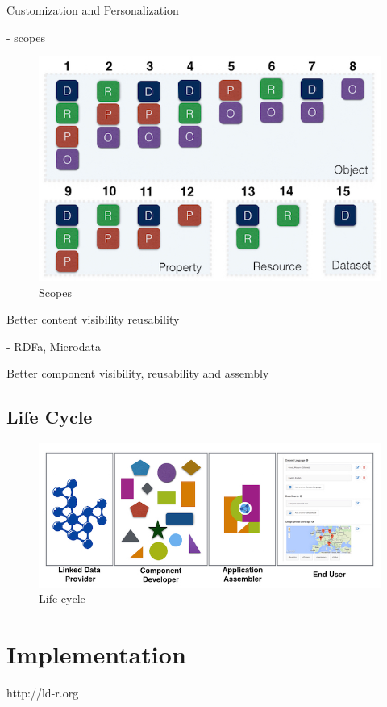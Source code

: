 \documentclass{acm_proc_article-sp}
\begin{document}
Customization and Personalization

- scopes

\begin{figure}[tb]
  \includegraphics[width=.9\linewidth]{images/scopes.jpg}
  \caption{Scopes}
\end{figure}

Better content visibility reusability

- RDFa, Microdata

Better component visibility, reusability and assembly


\subsection{Life Cycle}

\begin{figure}[tb]
  \includegraphics[width=1\linewidth]{images/lifecycle.jpg}
  \caption{Life-cycle}
\end{figure}

\section{Implementation}

http://ld-r.org
\end{document}
